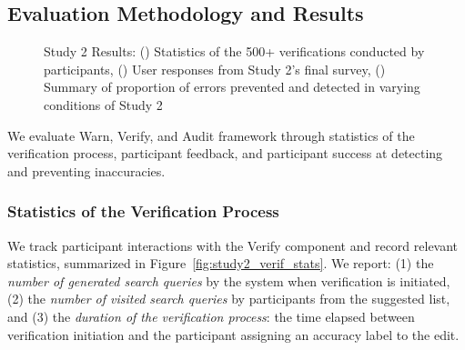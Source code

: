 \documentclass[manuscript]{acmart}
\begin{document}
\subsection{Evaluation Methodology and Results} \label{sec:study2_evaluation}

\begin{figure*}
    \centering
    \begin{minipage}[c]{.35\textwidth}
    \end{minipage}\hfill
    \begin{minipage}[c]{0.35\textwidth}
    \end{minipage}\hfill
    \begin{minipage}[c]{.26\textwidth}
    \end{minipage}\hfill
    \caption{Study 2 Results: () Statistics of the 500+ verifications conducted by participants, () User responses from Study 2's final survey, () Summary of proportion of errors prevented and detected in varying conditions of Study 2}
    \label{fig:study2_results}
\end{figure*}

We evaluate Warn, Verify, and Audit framework through statistics of the verification process, participant feedback, and participant success at detecting and preventing inaccuracies.

\subsubsection{Statistics of the Verification Process} \label{sec:study2_evaluation_verification}

We track participant interactions with the Verify component and record relevant statistics, summarized in Figure~\ref{fig:study2_verif_stats}. We report: (1) the \textit{number of generated search queries} by the system when verification is initiated, (2) the \textit{number of visited search queries} by participants from the suggested list, and (3) the \textit{duration of the verification process}: the time elapsed between verification initiation and the participant assigning an accuracy label to the edit.
\end{document}
